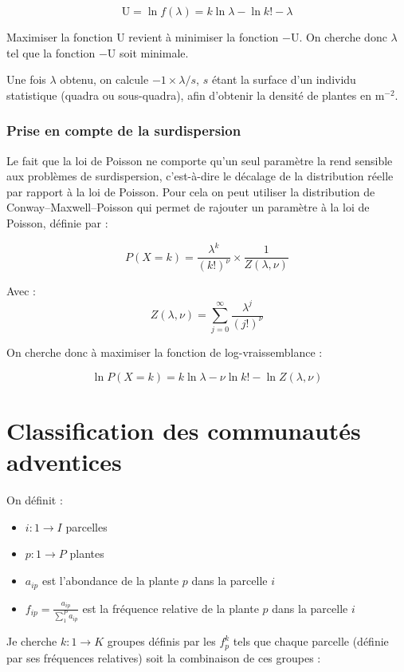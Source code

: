 \documentclass[a4paper, 12pt]{article}
\begin{document}
\[
  \mathrm{U} = \ln f(\lambda) = k\ln \lambda - \ln k! - \lambda
\]

Maximiser la fonction U revient à minimiser la fonction $-\mathrm{U}$.
On cherche donc $\lambda$ tel que la fonction $-\mathrm{U}$ soit minimale.

Une fois $\lambda$ obtenu, on calcule $-1 \times\lambda / s$, $s$ étant la
surface d'un individu statistique (quadra ou sous-quadra), afin d'obtenir la
densité de plantes en $\mathrm{m}^{-2}$.


\subsubsection{Prise en compte de la surdispersion}

Le fait que la loi de Poisson ne comporte qu'un seul paramètre la rend sensible
aux problèmes de surdispersion, c'est-à-dire le décalage de la distribution
réelle par rapport à la loi de Poisson.
Pour cela on peut utiliser la distribution de Conway–Maxwell–Poisson
\citep{shmueli2005useful} qui permet de rajouter un paramètre à la loi de
Poisson, définie par :

\[
  P(X = k) = \frac{\lambda^k}{(k!)^\nu} \times \frac{1}{Z(\lambda,\nu)}
\]

Avec :
\[
  Z(\lambda,\nu) = \sum^{\infty}_{j=0}\frac{\lambda^j}{(j!)^{\nu}}
\]

On cherche donc à maximiser la fonction de log-vraissemblance :

\[
  \ln P(X = k) = k\ln\lambda - \nu\ln k! - \ln Z(\lambda,\nu)
\]


\section{Classification des communautés adventices}

On définit :

\begin{itemize}
  \item $ i : 1 \to I $ parcelles
  \item $ p : 1 \to P $ plantes
  \item $ a_{ip} $ est l'abondance de la plante $p$ dans la parcelle $i$
  \item $f_{ip} = \frac{a_{ip}}{\sum_{1}^{P} a_{ip}}$ est la fréquence relative
    de la plante $p$ dans la parcelle $i$
\end{itemize}

Je cherche $ k: 1 \to K $ groupes définis par les $ f^{k}_{p} $ tels que chaque
parcelle (définie par ses fréquences relatives) soit la combinaison de ces
groupes :
\end{document}
